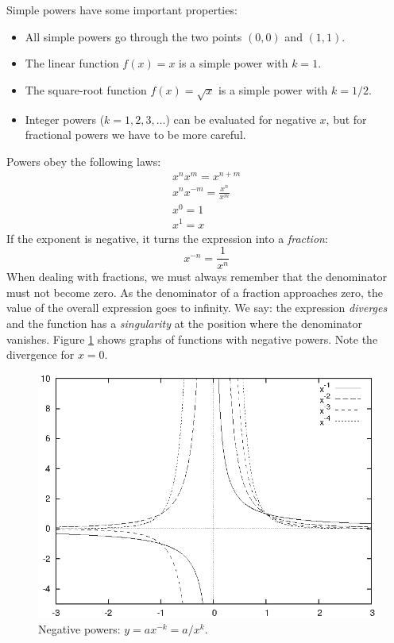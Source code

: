 Simple powers have some important properties:

\begin{itemize}
\item All simple powers go through the two points $(0,0)$ and $(1,1)$.
\item The linear function $f(x) = x$ is a simple power with $k = 1$.
\item The square-root function $f(x) = \sqrt{x}$ is a simple power with
  $k = 1/2$.
\item Integer powers ($k=1,2,3,\dotsc$) can be evaluated for negative
  $x$, but for fractional powers we have to be more careful.
\end{itemize}

Powers obey the following laws:
%
\begin{gather*}
x^n x^m = x^{n+m} \\
x^n x^{-m} = \frac{x^n}{x^m} \\
x^0 = 1 \\
x^1 = x
\end{gather*}
%
If the exponent is negative, it turns the expression into a
\emph{fraction}:
%
\[
x^{-n} = \frac{1}{x^n}
\]
%
When dealing with fractions, we must always remember that the
denominator must not become zero. As the denominator of a fraction
approaches zero, the value of the overall expression goes to infinity.
We say: the expression \emph{diverges} and the function has a
\emph{singularity} at the position where the denominator vanishes.
Figure \ref{fig:negpowers} shows graphs of functions with negative
powers.  Note the divergence for $x=0$.\vspace*{-6pt}

\begin{figure}
  \centerline{\includegraphics{img/negpowers}}
  \caption{Negative powers: $y = ax^{-k} = a/x^k$.}
  \label{fig:negpowers} \vspace*{9pt}
\end{figure}
    

